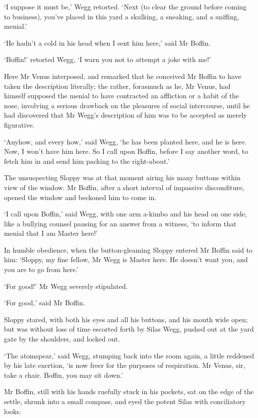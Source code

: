 ‘I suppose it must be,’ Wegg retorted. ‘Next (to clear the ground before
coming to business), you’ve placed in this yard a skulking, a sneaking,
and a sniffing, menial.’

‘He hadn’t a cold in his head when I sent him here,’ said Mr Boffin.

‘Boffin!’ retorted Wegg, ‘I warn you not to attempt a joke with me!’

Here Mr Venus interposed, and remarked that he conceived Mr Boffin to
have taken the description literally; the rather, forasmuch as he, Mr
Venus, had himself supposed the menial to have contracted an affliction
or a habit of the nose, involving a serious drawback on the pleasures of
social intercourse, until he had discovered that Mr Wegg’s description
of him was to be accepted as merely figurative.

‘Anyhow, and every how,’ said Wegg, ‘he has been planted here, and he
is here. Now, I won’t have him here. So I call upon Boffin, before I say
another word, to fetch him in and send him packing to the right-about.’

The unsuspecting Sloppy was at that moment airing his many buttons
within view of the window. Mr Boffin, after a short interval of
impassive discomfiture, opened the window and beckoned him to come in.

‘I call upon Boffin,’ said Wegg, with one arm a-kimbo and his head on
one side, like a bullying counsel pausing for an answer from a witness,
‘to inform that menial that I am Master here!’

In humble obedience, when the button-gleaming Sloppy entered Mr Boffin
said to him: ‘Sloppy, my fine fellow, Mr Wegg is Master here. He doesn’t
want you, and you are to go from here.’

‘For good!’ Mr Wegg severely stipulated.

‘For good,’ said Mr Boffin.

Sloppy stared, with both his eyes and all his buttons, and his mouth
wide open; but was without loss of time escorted forth by Silas Wegg,
pushed out at the yard gate by the shoulders, and locked out.

‘The atomspear,’ said Wegg, stumping back into the room again, a
little reddened by his late exertion, ‘is now freer for the purposes of
respiration. Mr Venus, sir, take a chair. Boffin, you may sit down.’

Mr Boffin, still with his hands ruefully stuck in his pockets, sat on
the edge of the settle, shrunk into a small compass, and eyed the potent
Silas with conciliatory looks.

